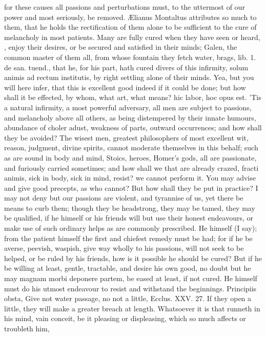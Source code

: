{for these causes all passions and perturbations must, to the uttermost
of our power and most seriously, be removed. \AE{}lianus Montaltus
attributes so much to them, that he holds the rectification of
them alone to be sufficient to the cure of melancholy in most patients.
Many are fully cured when they have seen or heard, \etc{}, enjoy their
desires, or be secured and satisfied in their minds; Galen, the common
master of them all, from whose fountain they fetch water, brags, lib.
1. de san. tuend., that he, for his part, hath cured divers of this
infirmity, solum animis ad rectum institutis, by right settling alone
of their minds.
Yea, but you will here infer, that this is excellent good indeed if it
could be done; but how shall it be effected, by whom, what art, what
means? hic labor, hoc opus est. 'Tis a natural infirmity, a most
powerful adversary, all men are subject to passions, and melancholy
above all others, as being distempered by their innate humours,
abundance of choler adust, weakness of parts, outward occurrences; and
how shall they be avoided? The wisest men, greatest philosophers of
most excellent wit, reason, judgment, divine spirits, cannot moderate
themselves in this behalf; such as are sound in body and mind, Stoics,
heroes, Homer's gods, all are passionate, and furiously carried
sometimes; and how shall we that are already crazed, fracti animis,
sick in body, sick in mind, resist? we cannot perform it. You may
advise and give good precepts, as who cannot? But how shall they be put
in practice? I may not deny but our passions are violent, and tyrannise
of us, yet there be means to curb them; though they be headstrong, they
may be tamed, they may be qualified, if he himself or his friends will
but use their honest endeavours, or make use of such ordinary helps as
are commonly prescribed.
He himself (I say); from the patient himself the first and chiefest
remedy must be had; for if he be averse, peevish, waspish, give way
wholly to his passions, will not seek to be helped, or be ruled by his
friends, how is it possible he should be cured? But if he be willing at
least, gentle, tractable, and desire his own good, no doubt but he may
magnam morbi deponere partem, be eased at least, if not cured. He
himself must do his utmost endeavour to resist and withstand the
beginnings. Principiis obsta, Give not water passage, no not a little,
Ecclus. XXV. 27. If they open a little, they will make a greater breach
at length. Whatsoever it is that runneth in his mind, vain conceit, be
it pleasing or displeasing, which so much affects or troubleth him,
}
